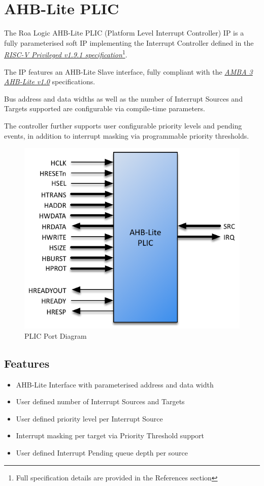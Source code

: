 \chapter{AHB-Lite PLIC}

The Roa Logic AHB-Lite PLIC (Platform Level Interrupt Controller) IP is a fully parameterised soft IP implementing the Interrupt Controller defined in the \emph{\href{https://github.com/riscv/riscv-isa-manual/blob/master/release/riscv-privileged-v1.9.1.pdf}{RISC-V Privileged v1.9.1 specification}}\footnote{Full specification details are provided in the References section}.

The IP features an AHB-Lite Slave interface, fully compliant with the \emph{\href{https://www.arm.com/products/system-ip/amba-specifications}{AMBA 3 AHB-Lite v1.0}} specifications. 

Bus address and data widths as well as the number of Interrupt Sources and Targets supported are configurable via compile-time parameters.

The controller further supports user configurable priority levels and pending events, in addition to interrupt masking via programmable priority thresholds.

\begin{figure}[!htb]
  \includegraphics{img/plic-ports.png}
  \caption{PLIC Port Diagram}
  \label{fig:PORTDIAG}
\end{figure}

\section{Features}

\begin{itemize}
\item
  AHB-Lite Interface with parameterised address and data width
\item
  User defined number of Interrupt Sources and Targets
\item
User defined priority level per Interrupt Source
\item
Interrupt masking per target via Priority Threshold support
\item
  User defined Interrupt Pending queue depth per source
\end{itemize}
